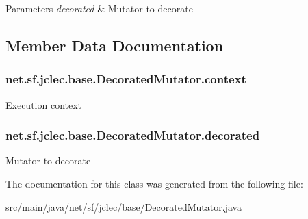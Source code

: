 \begin{DoxyParams}{Parameters}
{\em decorated} & Mutator to decorate \\
\hline
\end{DoxyParams}


\subsection{Member Data Documentation}
\hypertarget{classnet_1_1sf_1_1jclec_1_1base_1_1_decorated_mutator_a0f500ae1072a9663fa96475891c074bc}{
\subsubsection[{context}]{ net.\-sf.\-jclec.\-base.\-Decorated\-Mutator.\-context\hspace{0.3cm}{\ttfamily [protected]}}}\label{classnet_1_1sf_1_1jclec_1_1base_1_1_decorated_mutator_a0f500ae1072a9663fa96475891c074bc}
Execution context \hypertarget{classnet_1_1sf_1_1jclec_1_1base_1_1_decorated_mutator_a3eb423e738412ac288f0b37381e685f2}{
\subsubsection[{decorated}]{ net.\-sf.\-jclec.\-base.\-Decorated\-Mutator.\-decorated\hspace{0.3cm}{\ttfamily [protected]}}}\label{classnet_1_1sf_1_1jclec_1_1base_1_1_decorated_mutator_a3eb423e738412ac288f0b37381e685f2}
Mutator to decorate 

The documentation for this class was generated from the following file\-:\begin{DoxyCompactItemize}
\item 
src/main/java/net/sf/jclec/base/Decorated\-Mutator.\-java\end{DoxyCompactItemize}
